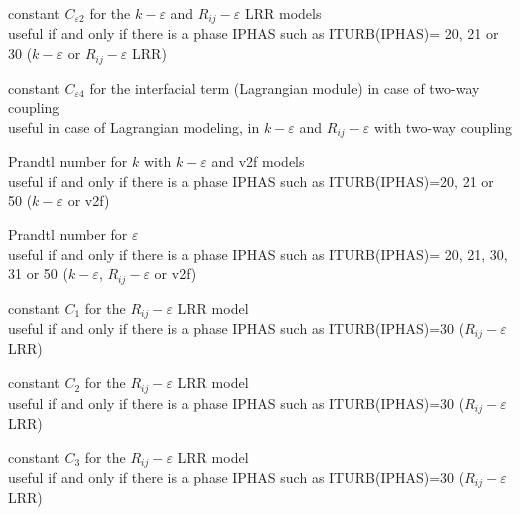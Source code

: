 {constant $C_{\varepsilon 2}$ for the $k-\varepsilon$ and
$R_{ij}-\varepsilon$ LRR models\\
useful if and only if there is a phase IPHAS such as ITURB(IPHAS)= 20, 21 or 30
($k-\varepsilon$ or $R_{ij}-\varepsilon$ LRR)}


{constant $C_{\varepsilon 4}$ for the interfacial term (Lagrangian module) in
case of two-way coupling\\
useful in case of Lagrangian modeling, in $k-\varepsilon$ and $R_{ij}-\varepsilon$
with two-way coupling}

{Prandtl number for $k$ with $k-\varepsilon$ and v2f models\\
useful if and only if there is a phase IPHAS such as ITURB(IPHAS)=20, 21 or 50
($k-\varepsilon$ or v2f)}

{Prandtl number for $\varepsilon$\\
useful if and only if there is a phase IPHAS such as ITURB(IPHAS)= 20,
21, 30, 31 or 50 ($k-\varepsilon$, $R_{ij}-\varepsilon$ or v2f)}


{constant $C_1$ for the $R_{ij}-\varepsilon$ LRR model\\
useful if and only if there is a phase IPHAS such as ITURB(IPHAS)=30
($R_{ij}-\varepsilon$ LRR)}

{constant $C_2$ for the $R_{ij}-\varepsilon$ LRR model\\
useful if and only if there is a phase IPHAS such as ITURB(IPHAS)=30
($R_{ij}-\varepsilon$ LRR)}

{constant $C_3$ for the $R_{ij}-\varepsilon$ LRR model\\
useful if and only if there is a phase IPHAS such as ITURB(IPHAS)=30
($R_{ij}-\varepsilon$ LRR)}


